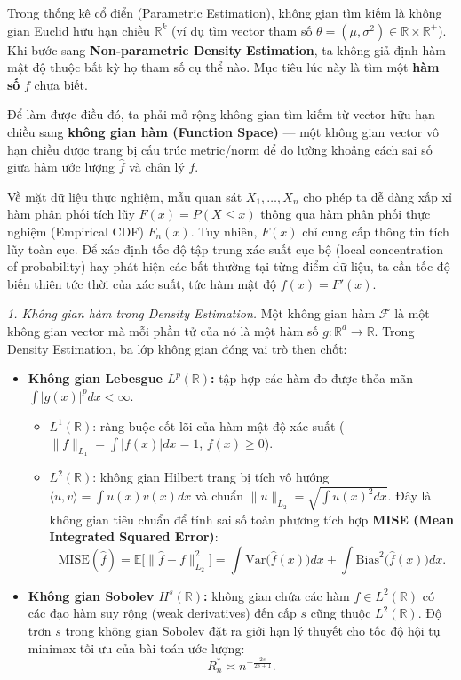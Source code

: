 Trong thống kê cổ điển (Parametric Estimation), không gian tìm kiếm là không gian Euclid hữu hạn chiều $\mathbb{R}^k$ (ví dụ tìm vector tham số $\theta=(\mu,\sigma^2)\in\mathbb{R}\times\mathbb{R}^{+}$). Khi bước sang \textbf{Non-parametric Density Estimation}, ta không giả định hàm mật độ thuộc bất kỳ họ tham số cụ thể nào. Mục tiêu lúc này là tìm một \textbf{hàm số} $f$ chưa biết.

Để làm được điều đó, ta phải mở rộng không gian tìm kiếm từ vector hữu hạn chiều sang \textbf{không gian hàm (Function Space)} --- một không gian vector vô hạn chiều được trang bị cấu trúc metric/norm để đo lường khoảng cách sai số giữa hàm ước lượng $\widehat f$ và chân lý $f$.

Về mặt dữ liệu thực nghiệm, mẫu quan sát $X_1,\dots,X_n$ cho phép ta dễ dàng xấp xỉ hàm phân phối tích lũy $F(x)=P(X\le x)$ thông qua hàm phân phối thực nghiệm (Empirical CDF) $F_n(x)$. Tuy nhiên, $F(x)$ chỉ cung cấp thông tin tích lũy toàn cục. Để xác định tốc độ tập trung xác suất cục bộ (local concentration of probability) hay phát hiện các bất thường tại từng điểm dữ liệu, ta cần tốc độ biến thiên tức thời của xác suất, tức hàm mật độ $f(x)=F'(x)$.


\textit{1. Không gian hàm trong Density Estimation.} Một không gian hàm $\mathcal{F}$ là một không gian vector mà mỗi phần tử của nó là một hàm số $g:\mathbb{R}^d\to\mathbb{R}$. Trong Density Estimation, ba lớp không gian đóng vai trò then chốt:
\begin{itemize}
\item \textbf{Không gian Lebesgue $L^p(\mathbb{R})$:} tập hợp các hàm đo được thỏa mãn $\int|g(x)|^{p}dx<\infty$.
  \begin{itemize}
  \item $L^1(\mathbb{R})$: ràng buộc cốt lõi của hàm mật độ xác suất ($\|f\|_{L_1}=\int|f(x)|dx=1$, $f(x)\ge 0$).
  \item $L^2(\mathbb{R})$: không gian Hilbert trang bị tích vô hướng $\langle u,v\rangle=\int u(x)v(x)dx$ và chuẩn $\|u\|_{L_2}=\sqrt{\int u(x)^2dx}$. Đây là không gian tiêu chuẩn để tính sai số toàn phương tích hợp \textbf{MISE (Mean Integrated Squared Error)}:
  \[ \mathrm{MISE}(\widehat f)=\mathbb{E}\Big[\big\|\widehat f-f\big\|_{L_2}^{2}\Big]=\int \mathrm{Var}\big(\widehat f(x)\big)dx+\int \mathrm{Bias}^{2}\big(\widehat f(x)\big)dx. \]
  \end{itemize}
\item \textbf{Không gian Sobolev $H^{s}(\mathbb{R})$:} không gian chứa các hàm $f\in L^2(\mathbb{R})$ có các đạo hàm suy rộng (weak derivatives) đến cấp $s$ cũng thuộc $L^2(\mathbb{R})$. Độ trơn $s$ trong không gian Sobolev đặt ra giới hạn lý thuyết cho tốc độ hội tụ minimax tối ưu của bài toán ước lượng:
\[ R_n^{*}\asymp n^{-\frac{2s}{2s+1}}. \]
\end{itemize}

